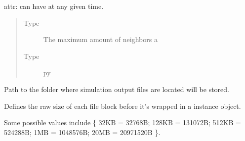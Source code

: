 \documentclass[letterpaper,10pt,english]{sphinxmanual}
\begin{document}

\begin{fulllineitems}
\label{\detokenize{app:app.environment_settings.NEWSCAST_CACHE_SIZE}}
attr: can have at any given time.
\begin{quote}\begin{description}
\item[{Type}] \leavevmode
The maximum amount of neighbors a

\item[{Type}] \leavevmode
py

\end{description}\end{quote}

\end{fulllineitems}


\begin{fulllineitems}
\label{\detokenize{app:app.environment_settings.OUTFILE_ROOT}}
Path to the folder where simulation output files are located will be
stored.

\end{fulllineitems}


\begin{fulllineitems}
\label{\detokenize{app:app.environment_settings.READ_SIZE}}
Defines the raw size of each file block before it’s wrapped in a
{\hyperref[\detokenize{app.domain.helpers:app.domain.helpers.smart_dataclasses.FileBlockData}]{}} instance
object.

Some possible values include \{ 32KB = 32768B; 128KB = 131072B; 512KB = 524288B;
1MB = 1048576B; 20MB = 20971520B \}.

\end{fulllineitems}
\end{document}
